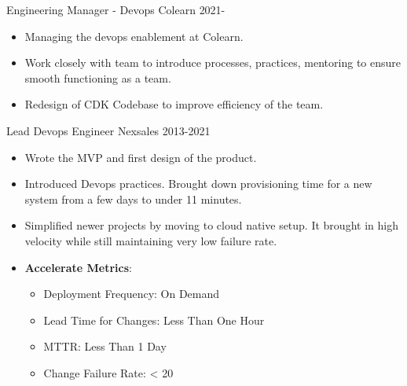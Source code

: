\documentclass[11pt]{spidercv}
\begin{document}
    





    \begin{MainPart}

    \Experience
        {\ColorHighlight}
		{Engineering Manager - Devops}
		{Colearn}
        {2021-\faUndo}
        {   
            \begin{itemize}
            	\item[\ding{51}] Managing the devops enablement at Colearn.\\
            	\item[\ding{51}] Work closely with team to introduce processes, practices, mentoring to ensure smooth functioning as a team. \\
 	           \item[\ding{51}] Redesign of CDK Codebase to improve efficiency of the team.
            \end{itemize}        
        }
    \Experience
        {\ColorHighlight}
		{Lead Devops Engineer}
		{Nexsales}
        {2013-2021}
        {  
        	\begin{itemize}
        		\item[\ding{51}]Wrote the MVP and first design of the product.\\ 
            	\item[\ding{51}]Introduced Devops practices. Brought down provisioning time for a new system from a few days to under 11 minutes. \\
            	\item[\ding{51}]Simplified newer projects by moving to cloud native setup. It brought in high velocity while still maintaining very low failure rate.\\
            	\item[\ding{51}]\textbf{Accelerate Metrics}: \\
            		\begin{itemize}
	            		\item Deployment Frequency: On Demand \\
            			\item Lead Time for Changes: Less Than One Hour \\
            		    \item MTTR: Less Than 1 Day \\
            			\item Change Failure Rate: < 20%
            		\end{itemize}
            \end{itemize}
        }


\end{MainPart}
\end{document}
